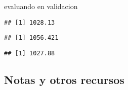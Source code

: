 \documentclass[
]{article}
\newenvironment{Shaded}{\begin{snugshade}}{\end{snugshade}}
\newcommand{\DecValTok}[1]{\textcolor[rgb]{0.00,0.00,0.81}{#1}}
\newcommand{\FunctionTok}[1]{\textcolor[rgb]{0.00,0.00,0.00}{#1}}
\newcommand{\NormalTok}[1]{#1}
\newcommand{\SpecialCharTok}[1]{\textcolor[rgb]{0.00,0.00,0.00}{#1}}
\begin{document}
evaluando en validacion

\begin{Shaded}
\end{Shaded}

\begin{verbatim}
## [1] 1028.13
\end{verbatim}

\begin{Shaded}
\end{Shaded}

\begin{verbatim}
## [1] 1056.421
\end{verbatim}

\begin{Shaded}
\end{Shaded}

\begin{verbatim}
## [1] 1027.88
\end{verbatim}

\hypertarget{notas-y-otros-recursos}{%
\subsection{Notas y otros recursos}\label{notas-y-otros-recursos}}
\end{document}
